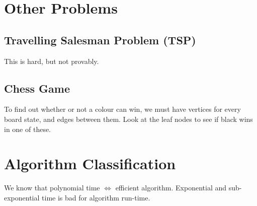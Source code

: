 \documentclass[12pt]{article}
\begin{document}
\section{Other Problems}

\subsection{Travelling Salesman Problem (TSP)}

This is hard, but not provably.

\subsection{Chess Game}

To find out whether or not a colour can win, we must have vertices for every
board state, and edges between them.  Look at the leaf nodes to see if black
wins in one of these.

\section{Algorithm Classification}

We know that polynomial time $\iff$ efficient algorithm. Exponential and
sub-exponential time is bad for algorithm run-time.
\end{document}

